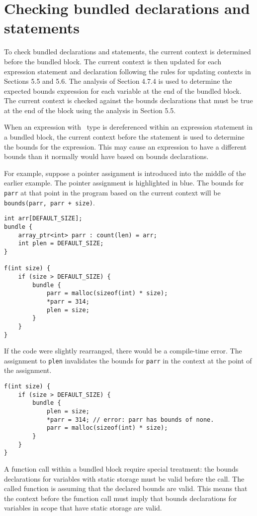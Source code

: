 \section{Checking bundled declarations and statements}\label{checking-bundled-declarations-and-statements}

To check bundled declarations and statements, the current context is
determined before the bundled block. The current context is then updated
for each expression statement and declaration following the rules for
updating contexts in Sections 5.5 and 5.6. The analysis of Section 4.7.4
is used to determine the expected bounds expression for each variable at
the end of the bundled block. The current context is checked against the
bounds declarations that must be true at the end of the block using the
analysis in Section 5.5.

When an expression with \arrayptr\ type is dereferenced within
an expression statement in a bundled block, the current context before
the statement is used to determine the bounds for the expression. This
may cause an expression to have a different bounds than it normally
would have based on bounds declarations.

For example, suppose a pointer assignment is introduced into the middle
of the earlier example. The pointer assignment is highlighted in blue.
The bounds for \verb|parr| at that point in the program based on the
current context will be \verb|bounds(parr, parr + size)|.
\begin{verbatim}
int arr[DEFAULT_SIZE];
bundle {
    array_ptr<int> parr : count(len) = arr;
    int plen = DEFAULT_SIZE;
}

f(int size) {
    if (size > DEFAULT_SIZE) {
        bundle {
            parr = malloc(sizeof(int) * size);
            *parr = 314;
            plen = size;
        }
    }
}
\end{verbatim}

If the code were slightly rearranged, there would be a compile-time
error. The assignment to \texttt{plen} invalidates the bounds for
\texttt{parr} in the context at the point of the assignment.
\begin{verbatim}
f(int size) {
    if (size > DEFAULT_SIZE) {
        bundle {
            plen = size;
            *parr = 314; // error: parr has bounds of none.
            parr = malloc(sizeof(int) * size);
        }
    }
}
\end{verbatim}

A function call within a bundled block require special treatment: the
bounds declarations for variables with static storage must be valid
before the call. The called function is assuming that the declared
bounds are valid. This means that the context before the function call
must imply that bounds declarations for variables in scope that have
static storage are valid.

